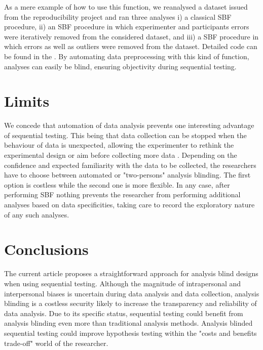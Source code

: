 \documentclass[a4paper,man,natbib,floatsintext,donotrepeattitle]{apa6}
\begin{document}
As a mere example of how to use this function, we reanalysed a dataset issued from the reproducibility project \citep{open_science_collaboration_estimating_2015} and ran three analyses i) a classical SBF procedure, ii) an SBF procedure in which experimenter and participants errors were iteratively removed from the considered dataset, and iii) a SBF procedure in which errors as well as outliers were removed from the dataset. Detailed code can be found in the .
\newline
By automating data preprocessing with this kind of function, analyses can easily be blind, ensuring objectivity during sequential testing.

\section{Limits}

We concede that automation of data analysis prevents one interesting advantage of sequential testing. This being that data collection can be stopped when the behaviour of data is unexpected, allowing the experimenter to rethink the experimental design or aim  before collecting more data \citep{lakens_performing_2014}. Depending on the confidence and expected familiarity with the data to be collected, the researchers have to choose between automated or "two-persons" analysis blinding. The first option is costless while the second one is more flexible. In any case, after performing SBF nothing prevents the researcher from performing additional analyses based on data specificities, taking care to record the exploratory nature of any such analyses. 

\section{Conclusions}

The current article proposes a straightforward approach for analysis blind designs when using sequential testing. Although the magnitude of intrapersonal and interpersonal biases is uncertain during data analysis and data collection, analysis blinding is a costless security likely to increase the transparency and reliability of data analysis. Due to its specific status, sequential testing could benefit from analysis blinding even more than traditional analysis methods. Analysis blinded sequential testing could improve hypothesis testing within the "costs and benefits trade-off" world of the researcher.
\end{document}
